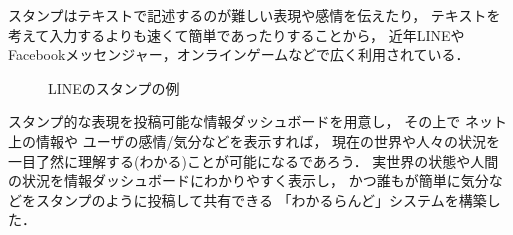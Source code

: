 スタンプはテキストで記述するのが難しい表現や感情を伝えたり，
テキストを考えて入力するよりも速くて簡単であったりすることから，
近年LINEやFacebookメッセンジャー，オンラインゲームなどで広く利用されている．

\begin{figure}[H]
\centering{}
\caption{LINEのスタンプの例}
\label{linestamp}
\end{figure}

スタンプ的な表現を投稿可能な情報ダッシュボードを用意し，
その上で
ネット上の情報や
ユーザの感情/気分などを表示すれば，
現在の世界や人々の状況を一目了然に理解する(わかる)ことが可能になるであろう．
%
実世界の状態や人間の状況を情報ダッシュボードにわかりやすく表示し，
かつ誰もが簡単に気分などをスタンプのように投稿して共有できる
「わかるらんど」システムを構築した．



